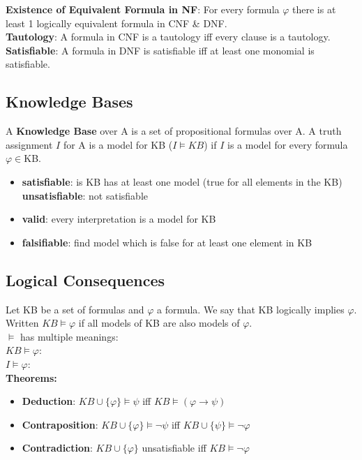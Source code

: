 \fontsize{6pt}{5pt}\selectfont
\textbf{Existence of Equivalent Formula in NF}: For every formula $\varphi$ there is at least 1 logically equivalent formula in CNF \& DNF. \\
\fontsize{7pt}{5pt}\selectfont
\textbf{Tautology}: A formula in CNF is a tautology iff every clause is a tautology. \\
\textbf{Satisfiable}: A formula in DNF is satisfiable iff at least one monomial is satisfiable. \\
\fontsize{6pt}{5pt}\selectfont
\subsection*{Knowledge Bases}
A \textbf{Knowledge Base} over A is a set of propositional formulas over A. A truth assignment $I$ for A is a model for KB ($I\vDash KB$) if $I$ is a model for every formula $\varphi \in $KB. 
\begin{itemize}[noitemsep,topsep=0pt,leftmargin=*]
    \item \textbf{satisfiable}: is KB has at least one model (true for all elements in the KB) \textbf{unsatisfiable}: not satisfiable
    \item \textbf{valid}: every interpretation is a model for KB
    \item \textbf{falsifiable}: find model which is false for at least one element in KB
\end{itemize}
\subsection*{Logical Consequences}
Let KB be a set of formulas and $\varphi$ a formula. We say that KB logically implies $\varphi$. Written $KB \vDash \varphi$ if all models of KB are also models of $\varphi$. \\
$\vDash$ has multiple meanings: \\
$KB \vDash \varphi$: \\
$I \vDash \varphi$: \\
\fontsize{7pt}{5pt}\selectfont
\textbf{Theorems:} 
\begin{itemize}[noitemsep,topsep=0pt,leftmargin=*,label={}]
    \item \textbf{Deduction}:  $KB \cup \{\varphi\} \vDash \psi$ iff $KB \vDash (\varphi \rightarrow \psi)$ 
    \item \textbf{Contraposition}: $KB \cup \{\varphi\} \vDash \neg \psi$ iff $KB \cup \{\psi\} \vDash \neg \varphi$
    \item \textbf{Contradiction}: $KB \cup \{\varphi\}$ unsatisfiable iff $KB \vDash \neg \varphi$ \\
\end{itemize}